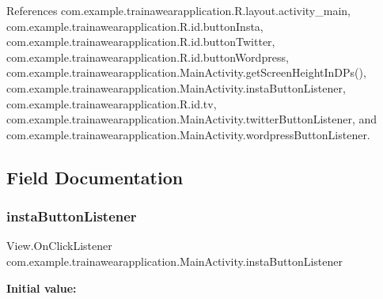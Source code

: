 References com.\+example.\+trainawearapplication.\+R.\+layout.\+activity\+\_\+main, com.\+example.\+trainawearapplication.\+R.\+id.\+button\+Insta, com.\+example.\+trainawearapplication.\+R.\+id.\+button\+Twitter, com.\+example.\+trainawearapplication.\+R.\+id.\+button\+Wordpress, com.\+example.\+trainawearapplication.\+Main\+Activity.\+get\+Screen\+Height\+In\+D\+Ps(), com.\+example.\+trainawearapplication.\+Main\+Activity.\+insta\+Button\+Listener, com.\+example.\+trainawearapplication.\+R.\+id.\+tv, com.\+example.\+trainawearapplication.\+Main\+Activity.\+twitter\+Button\+Listener, and com.\+example.\+trainawearapplication.\+Main\+Activity.\+wordpress\+Button\+Listener.



\subsection{Field Documentation}
\mbox{\label{classcom_1_1example_1_1trainawearapplication_1_1_main_activity_a46b1c1063fc63c8850150682ceef4d5b}} 
\subsubsection{\texorpdfstring{instaButtonListener}{instaButtonListener}}
{\footnotesize\ttfamily View.\+On\+Click\+Listener com.\+example.\+trainawearapplication.\+Main\+Activity.\+insta\+Button\+Listener\hspace{0.3cm}{\ttfamily [private]}}

{\bfseries Initial value\+:}
\begin{DoxyCode}{0}
\DoxyCodeLine{        \}}
\DoxyCodeLine{    \}}

\end{DoxyCode}


